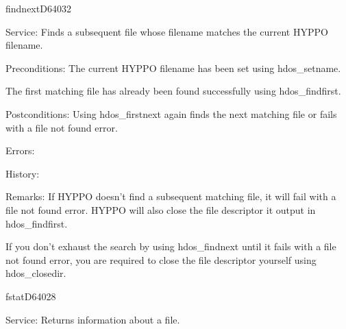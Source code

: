 %
\newpage
\begin{hyppotrap}{findnext}{D640}{32}
\item [Service:]
  Finds a subsequent file whose filename matches the current HYPPO filename.
\item [Preconditions:]
  The current HYPPO filename has been set using hdos\_setname.

  The first matching file has already been found successfully using
  hdos\_findfirst.
\item [Postconditions:]
  Using hdos\_firstnext again finds the next matching file or fails with a file
  not found error.
\item [Errors:]
\item [History:]
\item [Remarks:]
  If HYPPO doesn't find a subsequent matching file, it will fail with a
  file not found error. HYPPO will also close the file descriptor it
  output in hdos\_findfirst.

  If you don't exhaust the search by using hdos\_findnext until it fails with a
  file not found error, you are required to close the file descriptor yourself
  using hdos\_closedir.
\end{hyppotrap}


\newpage
\begin{hyppotrap}{fstat}{D640}{28}
\item [Service:]
  Returns information about a file.
\notimplemented
\end{hyppotrap}


